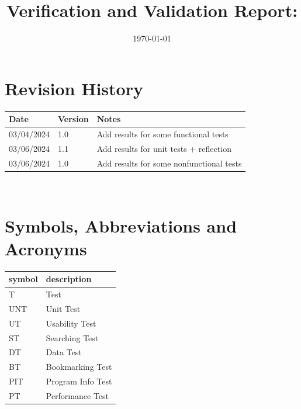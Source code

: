 \documentclass[12pt, titlepage]{article}
\begin{document}
\title{Verification and Validation Report: \progname}
\author{\authname}
\date{\today}

\maketitle


\section{Revision History}

\begin{tabularx}{\textwidth}{p{3cm}p{2cm}X}
  \toprule {\bf Date} & {\bf Version} & {\bf Notes}                              \\
  \midrule
  03/04/2024          & 1.0           & Add results for some functional tests    \\
  03/06/2024          & 1.1           & Add results for unit tests + reflection  \\
  03/06/2024          & 1.0           & Add results for some nonfunctional tests \\
  \bottomrule
\end{tabularx}

~\newpage

\section{Symbols, Abbreviations and Acronyms}

\renewcommand{\arraystretch}{1.2}
\begin{tabular}{l l}
  \toprule
  \textbf{symbol} & \textbf{description} \\
  \midrule
  T               & Test                 \\
  UNT             & Unit Test            \\
  UT              & Usability Test       \\
  ST              & Searching Test       \\
  DT              & Data Test            \\
  BT              & Bookmarking Test     \\
  PIT             & Program Info Test    \\
  PT              & Performance Test     \\
  \bottomrule
\end{tabular}\\
\end{document}
